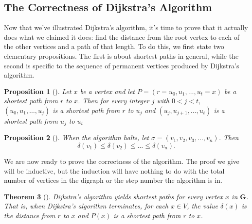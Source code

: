 \documentclass[10pt,]{book}
\theoremstyle{plain}
\newtheorem{theorem}{Theorem}[section]
\newtheorem{proposition}[theorem]{Proposition}
\theoremstyle{definition}
\theoremstyle{definition}
\theoremstyle{definition}
\theoremstyle{definition}
\numberwithin{equation}{section}
\newcommand{\bfG}{\mathbf{G}}
\newcommand{\lt}{<}
\begin{document}
\subsection[{The Correctness of Dijkstra's Algorithm}]{The Correctness of Dijkstra's Algorithm}\label{subsection-25}
\hypertarget{p-223}{}%
Now that we've illustrated Dijkstra's algorithm, it's time to prove that it actually does what we claimed it does: find the distance from the root vertex to each of the other vertices and a path of that length. To do this, we first state two elementary propositions. The first is about shortest paths in general, while the second is specific to the sequence of permanent vertices produced by Dijkstra's algorithm.%
\begin{proposition}[{}]\label{proposition-3}
\hypertarget{p-224}{}%
Let \(x\) be a vertex and let \(P=(r=u_0,u_1,\dots,u_t=x)\) be a shortest path from \(r\) to \(x\). Then for every integer \(j\) with \(0\lt j\lt t\), \((u_0,u_1,\dots,u_j)\) is a shortest path from \(r\) to \(u_j\) and \((u_j,u_{j+1},\dots,u_t)\) is a shortest path from \(u_j\) to \(u_t\)%
\end{proposition}
\begin{proposition}[{}]\label{proposition-4}
\hypertarget{p-225}{}%
When the algorithm halts, let \(\sigma=(v_1,v_2,v_3,\dots,v_n)\).  Then%
\begin{equation*}
\delta(v_1)\le \delta(v_2)\le\dots \le \delta(v_n).
\end{equation*}
%
\end{proposition}
\hypertarget{p-226}{}%
We are now ready to prove the correctness of the algorithm. The proof we give will be inductive, but the induction will have nothing to do with the total number of vertices in the digraph or the step number the algorithm is in.%
\begin{theorem}[{}]\label{theorem-4}
\hypertarget{p-227}{}%
Dijkstra's algorithm yields shortest paths for every vertex \(x\) in \(\bfG\). That is, when Dijkstra's algorithm terminates, for each \(x\in V\), the value \(\delta(x)\) is the distance from \(r\) to \(x\) and \(P(x)\) is a shortest path from \(r\) to \(x\).%
\end{theorem}
\end{document}
